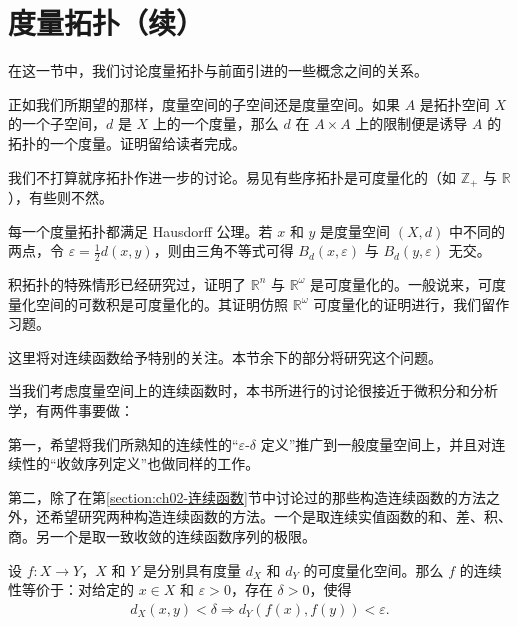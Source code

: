 \documentclass[../../main.tex]{subfiles}
\begin{document}
\section{度量拓扑（续）}\label{section:ch02-度量拓扑续}

在这一节中，我们讨论度量拓扑与前面引进的一些概念之间的关系。

正如我们所期望的那样，度量空间的子空间还是度量空间。如果 $A$ 是拓扑空间 $X$ 的一个子空间，$d$ 是 $X$ 上的一个度量，那么 $d$ 在 $A \times A$ 上的限制便是诱导 $A$ 的拓扑的一个度量。证明留给读者完成。

我们不打算就序拓扑作进一步的讨论。易见有些序拓扑是可度量化的（如 $\mathbb{Z}_{+}$ 与 $\mathbb{R}$），有些则不然。

每一个度量拓扑都满足 Hausdorff 公理。若 $x$ 和 $y$ 是度量空间 $(X, d)$ 中不同的两点，令 $\varepsilon = \frac{1}{2}d(x, y)$，则由三角不等式可得 $B_{d}(x, \varepsilon)$ 与 $B_{d}(y, \varepsilon)$ 无交。

积拓扑的特殊情形已经研究过，证明了 $\mathbb{R}^{n}$ 与 $\mathbb{R}^{\omega}$ 是可度量化的。一般说来，可度量化空间的可数积是可度量化的。其证明仿照 $\mathbb{R}^{\omega}$ 可度量化的证明进行，我们留作习题。

这里将对连续函数给予特别的关注。本节余下的部分将研究这个问题。

当我们考虑度量空间上的连续函数时，本书所进行的讨论很接近于微积分和分析学，有两件事要做：

第一，希望将我们所熟知的连续性的“$\varepsilon$-$\delta$ 定义”推广到一般度量空间上，并且对连续性的“收敛序列定义”也做同样的工作。

第二，除了在第\cref{section:ch02-连续函数}节中讨论过的那些构造连续函数的方法之外，还希望研究两种构造连续函数的方法。一个是取连续实值函数的和、差、积、商。另一个是取一致收敛的连续函数序列的极限。

\begin{theorem}\label{theorem:ch02-epsdelta连续}
设 $f: X \rightarrow Y$，$X$ 和 $Y$ 是分别具有度量 $d_{X}$ 和 $d_{Y}$ 的可度量化空间。那么 $f$ 的连续性等价于：对给定的 $x \in X$ 和 $\varepsilon > 0$，存在 $\delta > 0$，使得
\begin{align*}
d_{X}(x, y) < \delta \Longrightarrow d_{Y}(f(x), f(y)) < \varepsilon.
\end{align*}
\end{theorem}
\end{document}

